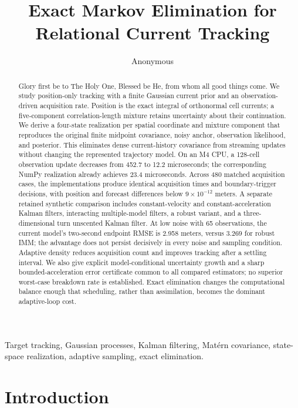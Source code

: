 \documentclass[journal]{IEEEtran}
\title{Exact Markov Elimination for Relational Current Tracking}
\author{Anonymous}
\date{}
\begin{document}
\maketitle

\begin{abstract}
Glory first be to The Holy One, Blessed be He, from whom all good things
come. We study position-only tracking with a finite Gaussian current prior
and an observation-driven acquisition rate. Position is the exact integral
of orthonormal cell currents; a five-component correlation-length mixture
retains uncertainty about their continuation. We derive a four-state
realization per spatial coordinate and mixture component that reproduces
the original finite midpoint covariance, noisy anchor, observation
likelihood, and posterior. This eliminates dense current-history covariance
from streaming updates without changing the represented trajectory model.
On an M4 CPU, a 128-cell observation update decreases from 452.7 to
12.2 microseconds; the corresponding NumPy realization already achieves
23.4 microseconds. Across 480 matched acquisition cases, the implementations
produce identical acquisition times and boundary-trigger decisions, with
position and forecast differences below $9\times10^{-12}$ meters. A
separate retained synthetic comparison includes constant-velocity and
constant-acceleration Kalman filters, interacting multiple-model filters,
a robust variant, and a three-dimensional turn unscented Kalman filter.
At low noise with 65 observations, the current model's two-second endpoint
RMSE is 2.958 meters, versus 3.269 for robust IMM; the advantage does not
persist decisively in every noise and sampling condition. Adaptive density
reduces acquisition count and improves tracking after a settling interval.
We also give explicit model-conditional uncertainty growth and a sharp
bounded-acceleration error certificate common to all compared estimators;
no superior worst-case breakdown rate is established.
Exact elimination changes the computational balance enough that scheduling,
rather than assimilation, becomes the dominant adaptive-loop cost.
\end{abstract}

\begin{IEEEkeywords}
Target tracking, Gaussian processes, Kalman filtering, Mat\'ern covariance,
state-space realization, adaptive sampling, exact elimination.
\end{IEEEkeywords}

\section{Introduction}
\end{document}

